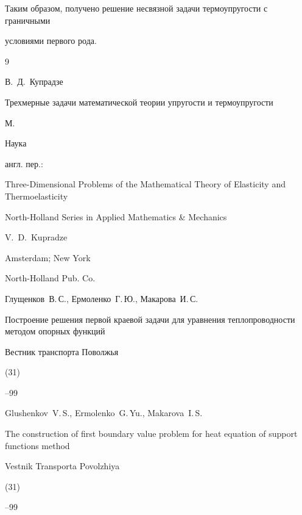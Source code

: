 Таким образом, получено решение несвязной задачи термоупругости с граничными

условиями первого рода.



\begin{thebibliography}{9}




\ed В.~Д.~Купрадзе

\book Трехмерные задачи математической теории упругости и термоупругости

\publaddr М.

\publ Наука



\transl англ. пер.:~

\book Three-Dimensional Problems of the Mathematical Theory of Elasticity and Thermoelasticity 

\serial North-Holland Series in Applied Mathematics \& Mechanics


\ed V.~D.~Kupradze 

\publaddr Amsterdam; New York 

\publ North-Holland Pub. Co.






\by Глущенков~В.\,С., Ермоленко~Г.\,Ю., Макарова~И.\,С.

\paper Построение решения первой краевой задачи для уравнения теплопроводности методом опорных функций

\jour Вестник транспорта Поволжья


(31)

--99


\misctransl

\by Glushenkov~V.\,S., Ermolenko~G.\,Yu., Makarova~I.\,S.

\paper The construction of  first boundary value problem for  heat equation of support functions method

\jour Vestnik Transporta Povolzhiya


(31)

--99



\end{thebibliography}







